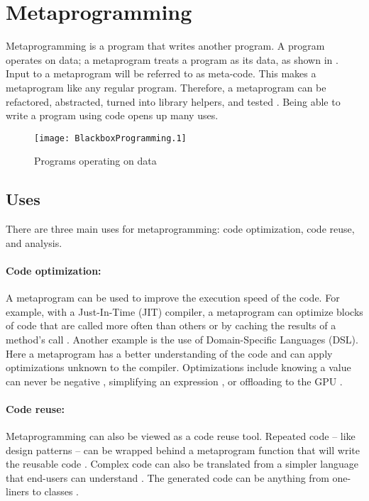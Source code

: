 \section{Metaprogramming}
\label{sec:metaprogramming}
Metaprogramming is a program that writes another program.
A program operates on data; a metaprogram treats a program as its data, as shown in  \cite{savidis_19_01, anggoro_17_01, sheard_01_01}.
Input to a metaprogram will be referred to as meta-code.
This makes a metaprogram like any regular program.
Therefore, a metaprogram can be refactored, abstracted, turned into library helpers, and tested \cite{lilis_15_01}.
Being able to write a program using code opens up many uses.

\begin{figure}[h]
	\centering
	\texttt{[image: BlackboxProgramming.1]}
	\caption{Programs operating on data}
	\label{fig:BlackboxProgramming}
\end{figure}


\subsection{Uses}
There are three main uses for metaprogramming: code optimization, code reuse, and analysis.

\paragraph{Code optimization:}
A metaprogram can be used to improve the execution speed of the code.
For example, with a Just-In-Time (JIT) compiler, a metaprogram can optimize blocks of code that are called more often than others \cite{hinsen_13_01} or by caching the results of a method's call \cite{seaton_15_01}.
Another example is the use of Domain-Specific Languages (DSL). 
Here a metaprogram has a better understanding of the code and can apply optimizations unknown to the compiler.
Optimizations include knowing a value can never be negative \cite{hinsen_13_01}, simplifying an expression \cite{sheard_01_01}, or offloading to the GPU \cite{videau_18_01}.

\paragraph{Code reuse:}
Metaprogramming can also be viewed as a code reuse tool.
Repeated code -- like design patterns \cite{lilis_15_01, alexandrescu_01_01} -- can be wrapped behind a metaprogram function that will write the reusable code \cite{savidis_19_01, klabnik_2019_01}.
Complex code can also be translated from a simpler language that end-users can understand \cite{hinsen_13_01}.
The generated code can be anything from one-liners to classes \cite{savidis_19_01}.

